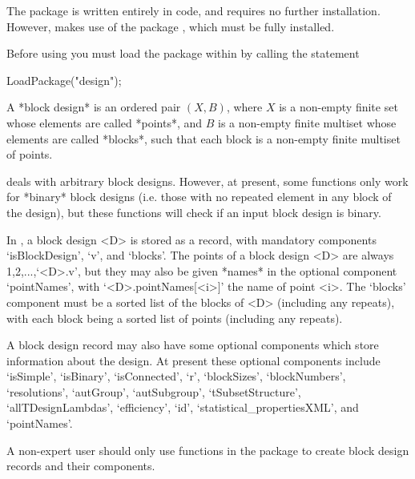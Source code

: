 The {\DESIGN} package is written entirely in {\GAP} code, and requires
no further installation.  However, {\DESIGN} makes use of the {\GRAPE}
package \cite{Grape}, which must be fully installed.


Before using {\DESIGN} you must load the package within {\GAP} by calling 
the statement

\begintt
LoadPackage("design");
\endtt


A *block design*
is an ordered pair $(X,B)$, where
$X$ is a non-empty finite set whose elements are called *points*, and
$B$ is a non-empty finite multiset whose elements are called *blocks*,
such that each block is a non-empty finite multiset of points.

{\DESIGN} deals with arbitrary block designs. However, at present, some
{\DESIGN} functions only work for *binary* block designs
(i.e. those with no repeated element in any block of
the design), but these functions will check if an input block design
is binary.

In {\DESIGN}, a block design <D> is stored as a record, with mandatory
components `isBlockDesign', `v', and `blocks'.  The points of a block
design <D> are always 1,2,...,`<D>.v', but they may also be given *names*
in the optional component `pointNames', with `<D>.pointNames[<i>]'
the name of point <i>.  The `blocks' component must be a sorted list
of the blocks of <D> (including any repeats), with each block being a
sorted list of points (including any repeats). 

A block design record may also have some optional components which store
information about the design. At present these optional components include
`isSimple', `isBinary', `isConnected', `r', `blockSizes', `blockNumbers',
`resolutions', `autGroup', `autSubgroup', `tSubsetStructure',
`allTDesignLambdas', `efficiency', `id', `statistical_propertiesXML',
and `pointNames'.

A non-expert user should only use functions in the {\DESIGN} package to
create block design records and their components.


